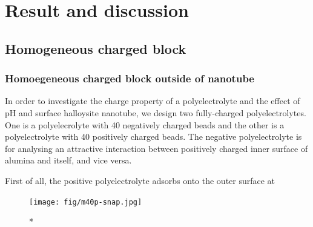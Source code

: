 
\chapter{Result and discussion}
\section{Homogeneous charged block}
\subsection{Homoegeneous charged block outside of nanotube}
In order to investigate the charge property of a polyelectrolyte and the effect of pH and surface halloysite nanotube, we design two fully-charged polyelectrolytes. One is a polyelecrolyte with 40 negatively charged beads and the other is a polyelectrolyte with 40 positively charged beads. The negative polyelectrolyte is for analysing an attractive interaction between positively charged inner surface of alumina and itself, and vice versa.  

First of all, the positive polyelectrolyte adsorbs onto the outer surface at 

    \begin{figure}[h!]
      \centering
        \texttt{[image: fig/m40p-snap.jpg]}
     \caption{*}
    \label{fig:m40n-snap}
    \end{figure}

